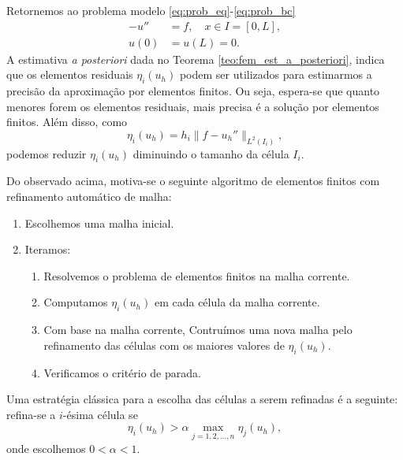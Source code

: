 Retornemos ao problema modelo \eqref{eq:prob_eq}-\eqref{eq:prob_bc}
\begin{align}
  -u'' &= f,\quad x\in I=[0,L],\\
  u(0) &= u(L) = 0.
\end{align}
A estimativa \textit{a posteriori} dada no Teorema \ref{teo:fem_est_a_posteriori}, indica que os elementos residuais $\eta_i(u_h)$ podem ser utilizados para estimarmos a precisão da aproximação por elementos finitos. Ou seja, espera-se que quanto menores forem os elementos residuais, mais precisa é a solução por elementos finitos. Além disso, como
\begin{equation}
  \eta_i(u_h) = h_i\|f - u_h''\|_{L^2(I_i)},
\end{equation}
podemos reduzir $\eta_i(u_h)$ diminuindo o tamanho da célula $I_i$.

Do observado acima, motiva-se o seguinte algoritmo de elementos finitos com refinamento automático de malha:
\begin{enumerate}
\item Escolhemos uma malha inicial.
\item Iteramos:
  \begin{enumerate}[2.]
  \item Resolvemos o problema de elementos finitos na malha corrente.
  \item Computamos $\eta_i(u_h)$ em cada célula da malha corrente.
  \item Com base na malha corrente, Contruímos uma nova malha pelo refinamento das células com os maiores valores de $\eta_i(u_h)$.
  \item Verificamos o critério de parada.
  \end{enumerate}
\end{enumerate}

Uma estratégia clássica para a escolha das células a serem refinadas é a seguinte: refina-se a $i$-ésima célula se
\begin{equation}\label{eq:ref_estrategia}
  \eta_i(u_h) > \alpha \max_{j=1, 2, \dotsc, n} \eta_j(u_h),
\end{equation}
onde escolhemos $0 < \alpha < 1$.

